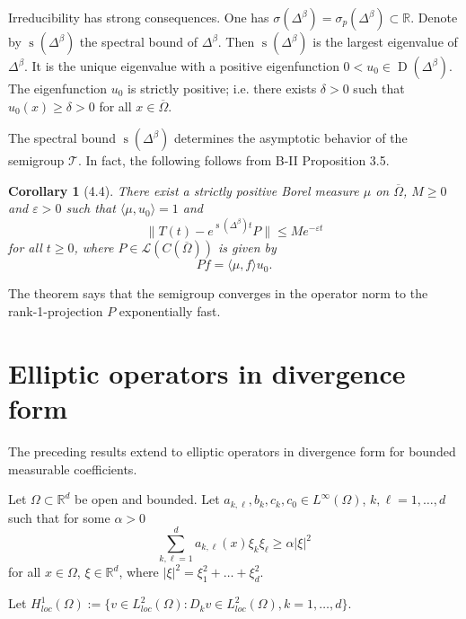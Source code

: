 \documentclass[11pt]{article}
\newtheorem{corollary}[theorem]{Corollary}
\DeclareMathOperator{\dom}{D}
\DeclareMathOperator{\spbound}{s}
\begin{document}
Irreducibility has strong consequences. One has $\sigma(\Delta^\beta) = \sigma_p(\Delta^\beta) \subset \mathbb{R}$. Denote by $\spbound(\Delta^\beta)$ the spectral bound of $\Delta^\beta$. Then $\spbound(\Delta^\beta)$ is the largest eigenvalue of $\Delta^\beta$. It is the unique eigenvalue with a positive eigenfunction $0 < u_0 \in \dom(\Delta^\beta)$. The eigenfunction $u_0$ is strictly positive; i.e. there exists $\delta > 0$ such that $u_0(x) \geq \delta > 0$ for all $x \in \overline{\Omega}$.

The spectral bound $\spbound(\Delta^\beta)$ determines the asymptotic behavior of the semigroup $\mathcal{T}$. In fact, the following follows from B-II Proposition 3.5.

\begin{corollary}[4.4]
There exist a strictly positive Borel measure $\mu$ on $\overline{\Omega}$, $M \geq 0$ and $\varepsilon > 0$ such that $\langle \mu, u_0 \rangle = 1$ and
\begin{equation}
\|T(t) - e^{\spbound(\Delta^\beta)t} P\| \leq M e^{-\varepsilon t}
\end{equation}
for all $t \geq 0$, where $P \in \mathcal{L}(C(\overline{\Omega}))$ is given by
\begin{equation}
Pf = \langle \mu, f \rangle u_0.
\end{equation}
\end{corollary}

The theorem says that the semigroup converges in the operator norm to the rank-1-projection $P$ exponentially fast.

\section{Elliptic operators in divergence form}

The preceding results extend to elliptic operators in divergence form for bounded measurable coefficients.

Let $\Omega \subset \mathbb{R}^d$ be open and bounded. Let $a_{k,\ell}, b_k, c_k, c_0 \in L^\infty(\Omega)$, $k, \ell = 1, \ldots, d$ such that for some $\alpha > 0$
\begin{equation}
\sum_{k,\ell=1}^d a_{k,\ell}(x) \xi_k \xi_\ell \geq \alpha |\xi|^2
\end{equation}
for all $x \in \Omega$, $\xi \in \mathbb{R}^d$, where $|\xi|^2 = \xi_1^2 + \ldots + \xi_d^2$.

Let $H^1_{loc}(\Omega) := \{v \in L^2_{loc}(\Omega) : D_k v \in L^2_{loc}(\Omega), k = 1, \ldots, d\}$.
\end{document}
